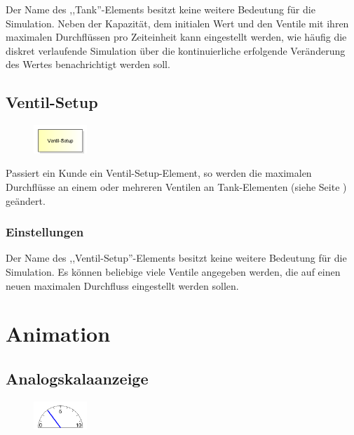 Der Name des ,,Tank''-Elements besitzt keine weitere Bedeutung für die Simulation.
Neben der Kapazität, dem initialen Wert und den Ventile mit ihren maximalen Durchflüssen
pro Zeiteinheit kann eingestellt werden, wie häufig die diskret verlaufende Simulation über die kontinuierliche
erfolgende Veränderung des Wertes benachrichtigt werden soll.


\section{Ventil-Setup}
\label{ref:ModelElementTankValveSetup}

\begin{figure}
\vspace{-22pt}
\includegraphics[width=2cm]{imageModelElementTankValveSetup.png}
\vspace{-22pt}
\end{figure}

Passiert ein Kunde ein Ventil-Setup-Element, so werden die maximalen Durchflüsse an einem
oder mehreren Ventilen an Tank-Elementen (siehe Seite \pageref{ref:ModelElementTank}) geändert.

\subsection*{Einstellungen}

Der Name des ,,Ventil-Setup''-Elements besitzt keine weitere Bedeutung für die Simulation.
Es können beliebige viele Ventile angegeben werden, die auf einen neuen maximalen Durchfluss
eingestellt werden sollen.





\chapter{Animation}

\section{Analogskalaanzeige}
\label{ref:ModelElementAnimationPointerMeasuring}

\begin{figure}
\vspace{-22pt}
\includegraphics[width=2cm]{imageModelElementAnimationPointerMeasuring.png}
\vspace{-22pt}
\end{figure}

